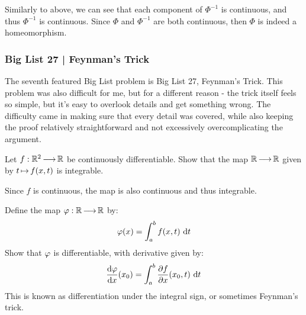 \begin{soln}
    Similarly to above, we can see that each component of $ \Phi^{-1} $ is
    continuous, and thus $ \Phi^{-1} $ is continuous. \vsp
    Since $ \Phi $ and $ \Phi^{-1} $ are both continuous, then $ \Phi $ is
    indeed a homeomorphism.
\end{soln}

\newpage

\subsubsection{Big List 27 | Feynman's Trick}

The seventh featured Big List problem is Big List 27, Feynman's Trick. This
problem was also difficult for me, but for a different reason - the trick itself
feels so simple, but it's easy to overlook details and get something wrong. The
difficulty came in making sure that every detail was covered, while also keeping
the proof relatively straightforward and not excessively overcomplicating the
argument.

\begin{qu}[num=27.1]
    Let $ f : \mathbb{R}^{2} \operatorname{\longrightarrow} \mathbb{R} $ be continuously differentiable.
    Show that the map $ \mathbb{R} \operatorname{\longrightarrow} \mathbb{R} $ given by $ t \operatorname{\mapsto} f(x, t) $ is
    integrable.
\end{qu}

\begin{soln}
    Since $ f $ is continuous, the map is also continuous and thus integrable.
\end{soln}

\begin{qu}[title=Feynman's Trick,num=27.2]
    Define the map $ \operatorname{\varphi}: \mathbb{R}\operatorname{\longrightarrow} \mathbb{R} $ by:
    \begin{equation*}
        \operatorname{\varphi}(x) = \int_{a}^{b} f(x,t) \textrm{ d} t
    \end{equation*}
    Show that $ \operatorname{\varphi} $ is differentiable, with derivative given by:
    \begin{equation*}
        \frac{\textrm{d}\!\operatorname{\varphi}}{\textrm{d} x}(x_{0}) = \int_{a}^{b}\frac{\partial f}{\partial x} (x_{0}, t)
        \textrm{ d} t
    \end{equation*}
    This is known as differentiation under the integral sign, or sometimes
    Feynman's trick.
\end{qu}

